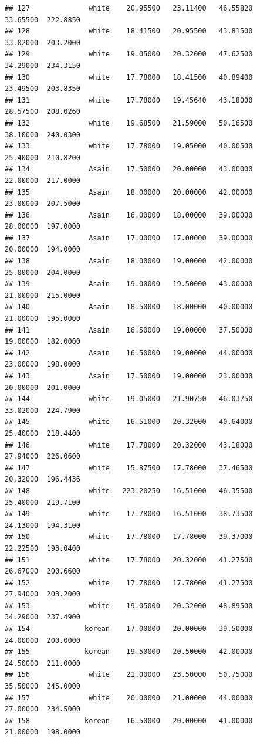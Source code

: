 \documentclass[]{article}
\begin{document}
\begin{verbatim}
## 127              white    20.95500   23.11400   46.55820     33.65500  222.8850
## 128              white    18.41500   20.95500   43.81500     33.02000  203.2000
## 129              white    19.05000   20.32000   47.62500     34.29000  234.3150
## 130              white    17.78000   18.41500   40.89400     23.49500  203.8350
## 131              white    17.78000   19.45640   43.18000     28.57500  208.0260
## 132              white    19.68500   21.59000   50.16500     38.10000  240.0300
## 133              white    17.78000   19.05000   40.00500     25.40000  210.8200
## 134              Asain    17.50000   20.00000   43.00000     22.00000  217.0000
## 135              Asain    18.00000   20.00000   42.00000     23.00000  207.5000
## 136              Asain    16.00000   18.00000   39.00000     28.00000  197.0000
## 137              Asain    17.00000   17.00000   39.00000     20.00000  194.0000
## 138              Asain    18.00000   19.00000   42.00000     25.00000  204.0000
## 139              Asain    19.00000   19.50000   43.00000     21.00000  215.0000
## 140              Asain    18.50000   18.00000   40.00000     21.00000  195.0000
## 141              Asain    16.50000   19.00000   37.50000     19.00000  182.0000
## 142              Asain    16.50000   19.00000   44.00000     23.00000  198.0000
## 143              Asain    17.50000   19.00000   23.00000     20.00000  201.0000
## 144              white    19.05000   21.90750   46.03750     33.02000  224.7900
## 145              white    16.51000   20.32000   40.64000     25.40000  218.4400
## 146              white    17.78000   20.32000   43.18000     27.94000  226.0600
## 147              white    15.87500   17.78000   37.46500     20.32000  196.4436
## 148              white   223.20250   16.51000   46.35500     25.40000  219.7100
## 149              white    17.78000   16.51000   38.73500     24.13000  194.3100
## 150              white    17.78000   17.78000   39.37000     22.22500  193.0400
## 151              white    17.78000   20.32000   41.27500     26.67000  200.6600
## 152              white    17.78000   17.78000   41.27500     27.94000  203.2000
## 153              white    19.05000   20.32000   48.89500     34.29000  237.4900
## 154             korean    17.00000   20.00000   39.50000     24.00000  200.0000
## 155             korean    19.50000   20.50000   42.00000     24.50000  211.0000
## 156              white    21.00000   23.50000   50.75000     35.50000  245.0000
## 157              white    20.00000   21.00000   44.00000     27.00000  234.5000
## 158             korean    16.50000   20.00000   41.00000     21.00000  198.0000

\end{verbatim}
\end{document}
